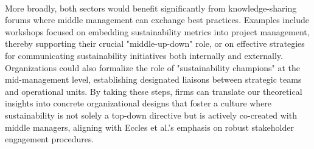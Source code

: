 	\paragraph*{} More broadly, both sectors would benefit significantly from knowledge-sharing forums where middle management can exchange best practices. Examples include workshops focused on embedding sustainability metrics into project management, thereby supporting their crucial "middle-up-down" role, or on effective strategies for communicating sustainability initiatives both internally and externally. Organizations could also formalize the role of "sustainability champions" at the mid-management level, establishing designated liaisons between strategic teams and operational units. By taking these steps, firms can translate our theoretical insights into concrete organizational designs that foster a culture where sustainability is not solely a top-down directive but is actively co-created with middle managers, aligning with Eccles et al.'s emphasis on robust stakeholder engagement procedures.
	
